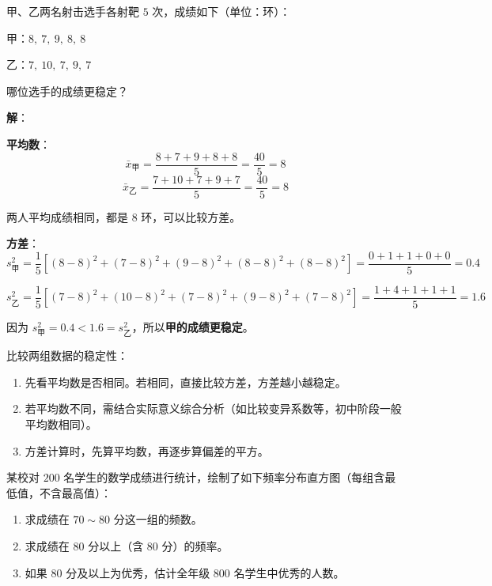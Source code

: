 \documentclass[12pt, a4paper]{ctexart}
\begin{document}
\begin{examplebox}[【例题4】方差计算与比较]
甲、乙两名射击选手各射靶 $5$ 次，成绩如下（单位：环）：

甲：$8,\ 7,\ 9,\ 8,\ 8$

乙：$7,\ 10,\ 7,\ 9,\ 7$

哪位选手的成绩更稳定？
\end{examplebox}

\textbf{解}：

\textbf{平均数}：
$$\bar{x}_{\text{甲}} = \frac{8+7+9+8+8}{5} = \frac{40}{5} = 8$$
$$\bar{x}_{\text{乙}} = \frac{7+10+7+9+7}{5} = \frac{40}{5} = 8$$

两人平均成绩相同，都是 $8$ 环，可以比较方差。

\textbf{方差}：
$$s^2_{\text{甲}} = \frac{1}{5}\left[(8-8)^2+(7-8)^2+(9-8)^2+(8-8)^2+(8-8)^2\right] = \frac{0+1+1+0+0}{5} = 0.4$$

$$s^2_{\text{乙}} = \frac{1}{5}\left[(7-8)^2+(10-8)^2+(7-8)^2+(9-8)^2+(7-8)^2\right] = \frac{1+4+1+1+1}{5} = 1.6$$

因为 $s^2_{\text{甲}} = 0.4 < 1.6 = s^2_{\text{乙}}$，所以\textbf{甲的成绩更稳定}。

\begin{tipbox}[方法总结]
比较两组数据的稳定性：
\begin{enumerate}[leftmargin=2em]
  \item 先看平均数是否相同。若相同，直接比较方差，方差越小越稳定。
  \item 若平均数不同，需结合实际意义综合分析（如比较变异系数等，初中阶段一般平均数相同）。
  \item 方差计算时，先算平均数，再逐步算偏差的平方。
\end{enumerate}
\end{tipbox}

\begin{examplebox}[【例题5】读频率分布直方图]
某校对 $200$ 名学生的数学成绩进行统计，绘制了如下频率分布直方图（每组含最低值，不含最高值）：

\begin{center}
\end{center}

\begin{enumerate}[leftmargin=2em]
  \item 求成绩在 $70\sim80$ 分这一组的频数。
  \item 求成绩在 $80$ 分以上（含 $80$ 分）的频率。
  \item 如果 $80$ 分及以上为优秀，估计全年级 $800$ 名学生中优秀的人数。
\end{enumerate}
\end{examplebox}
\end{document}

